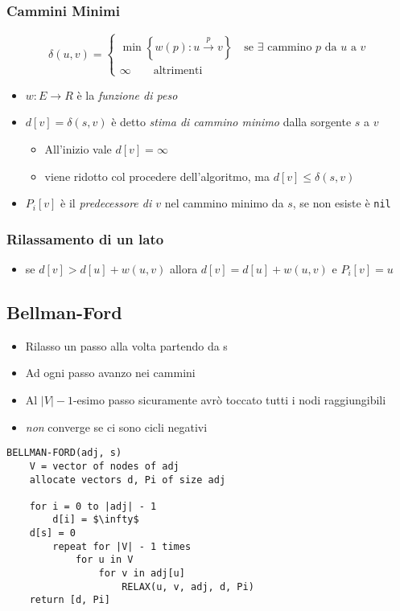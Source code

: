 \documentclass[10pt,a4paper]{article}
\newcommand{\code}{\texttt}
\begin{document}
\begin{multicols*}{2}
\subsubsection*{Cammini Minimi}
\begin{equation*}
    \delta(u,v) = \begin{cases}
        \min\left\{w(p): u\xrightarrow p v\right\} \quad \text{se $\exists$ cammino $p$ da $u$ a $v$}\\
        \infty \qquad \text{altrimenti}
    \end{cases}
\end{equation*}
\begin{itemize}
    \item $w: E \rightarrow R$ è la \emph{funzione di peso}
    \item $d[v] = \delta(s, v)$ è detto \emph{stima di cammino minimo} dalla sorgente $s$ a $v$ 
    \begin{itemize}
        \item All'inizio vale $d[v] = \infty$
        \item viene ridotto col procedere dell'algoritmo, ma $d[v] \le \delta(s, v)$
    \end{itemize}
    \item $P_i[v]$ è il \emph{predecessore di $v$} nel cammino minimo da $s$, se non esiste è \code{nil}
\end{itemize}

\subsubsection*{Rilassamento di un lato}
\begin{itemize}
    \item se $d[v] > d[u]+w(u,v)$ allora $d[v] = d[u] + w(u,v)$ e $P_i[v]=u$
\end{itemize}
\subsection*{Bellman-Ford}
\begin{itemize}
    \item Rilasso un passo alla volta partendo da s
    \item Ad ogni passo avanzo nei cammini
    \item Al $|V| - 1$-esimo passo sicuramente avrò toccato tutti i nodi raggiungibili
    \item \emph{non} converge se ci sono cicli negativi
\end{itemize}
\begin{lstlisting}
BELLMAN-FORD(adj, s)
    V = vector of nodes of adj
    allocate vectors d, Pi of size adj

    for i = 0 to |adj| - 1
        d[i] = $\infty$
    d[s] = 0
        repeat for |V| - 1 times
            for u in V
                for v in adj[u]
                    RELAX(u, v, adj, d, Pi)
    return [d, Pi]
\end{lstlisting}
\end{multicols*}
\end{document}
